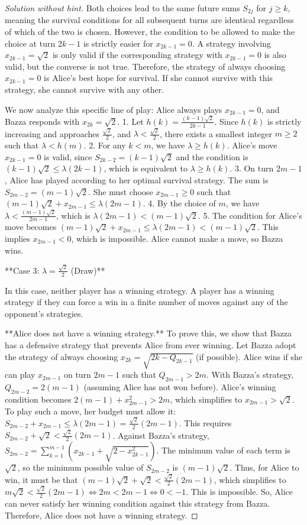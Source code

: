 \begin{proof} [Solution without hint]
Both choices lead to the same future sums $S_{2j}$ for $j \ge k$, meaning the survival conditions for all subsequent turns are identical regardless of which of the two is chosen. However, the condition to be allowed to make the choice at turn $2k-1$ is strictly easier for $x_{2k-1}=0$. A strategy involving $x_{2k-1}=\sqrt{2}$ is only valid if the corresponding strategy with $x_{2k-1}=0$ is also valid, but the converse is not true. Therefore, the strategy of always choosing $x_{2k-1}=0$ is Alice's best hope for survival. If she cannot survive with this strategy, she cannot survive with any other.

We now analyze this specific line of play: Alice always plays $x_{2k-1}=0$, and Bazza responds with $x_{2k}=\sqrt{2}$.
1.  Let $h(k) = \frac{(k-1)\sqrt{2}}{2k-1}$. Since $h(k)$ is strictly increasing and approaches $\frac{\sqrt{2}}{2}$, and $\lambda < \frac{\sqrt{2}}{2}$, there exists a smallest integer $m \ge 2$ such that $\lambda < h(m)$.
2.  For any $k < m$, we have $\lambda \ge h(k)$. Alice's move $x_{2k-1}=0$ is valid, since $S_{2k-2}=(k-1)\sqrt{2}$ and the condition is $(k-1)\sqrt{2} \le \lambda(2k-1)$, which is equivalent to $\lambda \ge h(k)$.
3.  On turn $2m-1$, Alice has played according to her optimal survival strategy. The sum is $S_{2m-2}=(m-1)\sqrt{2}$. She must choose $x_{2m-1} \ge 0$ such that $(m-1)\sqrt{2} + x_{2m-1} \le \lambda(2m-1)$.
4.  By the choice of $m$, we have $\lambda < \frac{(m-1)\sqrt{2}}{2m-1}$, which is $\lambda(2m-1) < (m-1)\sqrt{2}$.
5.  The condition for Alice's move becomes $(m-1)\sqrt{2} + x_{2m-1} \le \lambda(2m-1) < (m-1)\sqrt{2}$. This implies $x_{2m-1} < 0$, which is impossible.
Alice cannot make a move, so Bazza wins.

**Case 3: $\lambda = \frac{\sqrt{2}}{2}$ (Draw)**

In this case, neither player has a winning strategy. A player has a winning strategy if they can force a win in a finite number of moves against any of the opponent's strategies.

**Alice does not have a winning strategy.**
To prove this, we show that Bazza has a defensive strategy that prevents Alice from ever winning. Let Bazza adopt the strategy of always choosing $x_{2k} = \sqrt{2k - Q_{2k-1}}$ (if possible).
Alice wins if she can play $x_{2m-1}$ on turn $2m-1$ such that $Q_{2m-1} > 2m$. With Bazza's strategy, $Q_{2m-2}=2(m-1)$ (assuming Alice has not won before). Alice's winning condition becomes $2(m-1)+x_{2m-1}^2 > 2m$, which simplifies to $x_{2m-1} > \sqrt{2}$.
To play such a move, her budget must allow it: $S_{2m-2} + x_{2m-1} \le \lambda(2m-1) = \frac{\sqrt{2}}{2}(2m-1)$.
This requires $S_{2m-2} + \sqrt{2} < \frac{\sqrt{2}}{2}(2m-1)$.
Against Bazza's strategy, $S_{2m-2} = \sum_{k=1}^{m-1} (x_{2k-1} + \sqrt{2-x_{2k-1}^2})$. The minimum value of each term is $\sqrt{2}$, so the minimum possible value of $S_{2m-2}$ is $(m-1)\sqrt{2}$.
Thus, for Alice to win, it must be that $(m-1)\sqrt{2} + \sqrt{2} < \frac{\sqrt{2}}{2}(2m-1)$, which simplifies to $m\sqrt{2} < \frac{\sqrt{2}}{2}(2m-1) \iff 2m < 2m-1 \iff 0 < -1$. This is impossible.
So, Alice can never satisfy her winning condition against this strategy from Bazza. Therefore, Alice does not have a winning strategy.


\end{proof}
